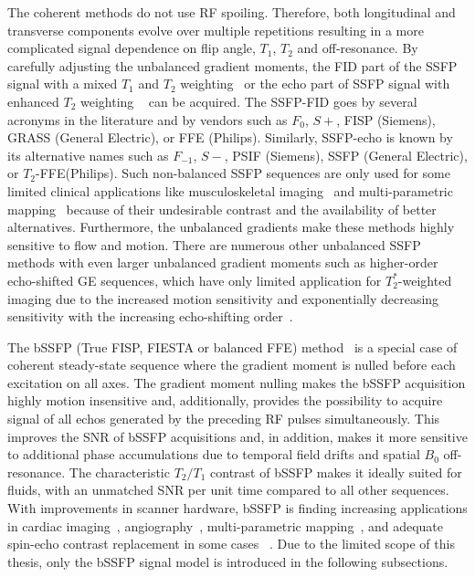 The coherent methods do not use RF spoiling. Therefore, both longitudinal and transverse components evolve over multiple repetitions resulting in a more complicated signal dependence on flip angle, $T_1$, $T_2$ and off-resonance. By carefully adjusting the unbalanced gradient moments, the \gls{FID} part of the \gls{SSFP} signal with a mixed $T_1$ and $T_2$ weighting~\cite{oppletFISPNewFast1986} or the echo part of \gls{SSFP} signal with enhanced $T_2$ weighting ~\cite{gyngellApplicationSteadystateFree1988} can be acquired. The \gls{SSFP}-\gls{FID} goes by several acronyms in the literature and by vendors such as $F_0$, $S+$, \gls{FISP} (Siemens), \gls{GRASS} (General Electric), or \gls{FFE} (Philips). Similarly,  \gls{SSFP}-echo is known by its alternative names such as $F_{-1}$, $S-$, \gls{PSIF} (Siemens), \gls{SSFP} (General Electric), or $T_2$-\gls{FFE}(Philips). Such non-balanced \gls{SSFP} sequences are only used for some limited clinical applications like musculoskeletal imaging~\cite{bruderNewSteadystateImaging1988,welschRapidEstimationCartilage2009} and multi-parametric mapping~\cite{heuleTripleEchoSteadystate2014} because of their undesirable contrast and the availability of better alternatives. Furthermore, the unbalanced gradients make these methods highly sensitive to flow and motion. There are numerous other unbalanced \gls{SSFP} methods with even larger unbalanced gradient moments such as higher-order echo-shifted \gls{GE} sequences, which have only limited application for $T_2^*$-weighted imaging due to the increased motion sensitivity and exponentially decreasing sensitivity with the increasing echo-shifting order~\cite{chungSignalFormationEchoshifted1999, schefflerPictorialDescriptionSteadystates1999,ehsesEfficientGenerationT2weighted2015}.

The \gls{bSSFP} (True \gls{FISP}, \gls{FIESTA} or balanced \gls{FFE}) method~\cite{carrSteadyStateFreePrecession1958, zurMotioninsensitiveSteadystateFree1990} is a special case of coherent steady-state sequence where the gradient moment is nulled before each excitation on all axes. The gradient moment nulling makes the \gls{bSSFP} acquisition highly motion insensitive and, additionally, provides the possibility to
acquire signal of all echos generated by the preceding \gls{RF} pulses simultaneously. This improves the \gls{SNR} of \gls{bSSFP} acquisitions and, in addition, makes it more sensitive to additional phase accumulations due to temporal field drifts and spatial $B_0$ off-resonance. The characteristic $T_2/T_1$ contrast of \gls{bSSFP} makes it ideally suited for fluids, with an unmatched \gls{SNR} per unit time compared to all other sequences. With improvements in scanner hardware, \gls{bSSFP} is finding increasing applications in cardiac imaging~\cite{jungSinglebreathhold3DtrueFISPCine2002}, angiography~\cite{deshpande3DMagnetizationpreparedTrueFISP2001}, multi-parametric mapping~\cite{nguyenMotioninsensitiveRapidConfiguration2017,birkFlexibleCosteffectiveDeep2025}, and adequate spin-echo contrast replacement in some cases ~\cite{schefflerPrinciplesApplicationsBalanced2003,schiedaPracticalApplicationsBalanced2017}. Due to the limited scope of this thesis, only the \gls{bSSFP} signal model is introduced in the following subsections.

